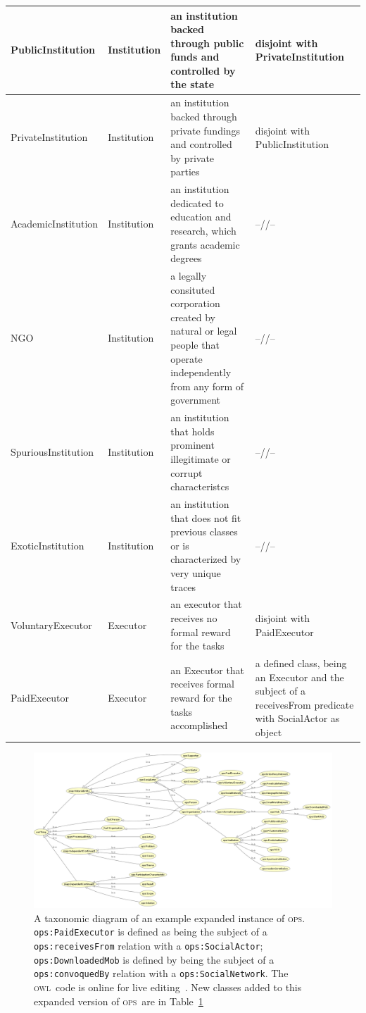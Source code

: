 \documentclass[10pt,letterpaper]{article}
\newcommand{\ops}{\textsc{ops}}
\newcommand{\owl}{\textsc{owl}}
\begin{document}
\begin{table}[!h]
\begin{adjustwidth}{-2.25in}{0in}
\begin{tabular}{|l|l|p{5.4cm}|p{5.3cm}|}
PublicInstitution & Institution & an institution backed through public funds and controlled by the state & disjoint with PrivateInstitution \\ \hline
PrivateInstitution & Institution & an institution backed through private fundings and controlled by private parties & disjoint with PublicInstitution \\ \hline
AcademicInstitution & Institution & an institution dedicated to education and research, which grants academic degrees & --//-- \\ \hline
NGO & Institution & a legally consituted corporation created by natural or legal people that operate independently from any form of government & --//-- \\\hline
SpuriousInstitution & Institution & an institution that holds prominent illegitimate or corrupt characteristcs & --//-- \\\hline
ExoticInstitution & Institution & an institution that does not fit previous classes or is characterized by very unique traces & --//-- \\\hline\hline
VoluntaryExecutor & Executor & an executor that receives no formal reward for the tasks & disjoint with PaidExecutor \\ \hline
PaidExecutor & Executor & an Executor that receives formal reward for the tasks accomplished & a defined class, being an Executor and the subject of a receivesFrom predicate with SocialActor as object\\ \hline
  \end{tabular}
  \label{ospFooClass}
\end{adjustwidth}
\end{table}

\begin{figure}[!h]
        \includegraphics[width=1.05\textwidth]{figs/opsExpandedTax}
        \caption{A taxonomic diagram of an example expanded instance of \ops.
	{\tt ops:PaidExecutor} is defined as being the subject of a
	\texttt{ops:receivesFrom} relation with a \texttt{ops:SocialActor};
	\texttt{ops:DownloadedMob} is defined by being the subject of a
	\texttt{ops:convoquedBy} relation with a \texttt{ops:SocialNetwork}.
	The \owl\ code is online for live editing~\cite{owlExp}.
	New classes added to this expanded version of \ops\ are in Table~\ref{ospFooClass}}
    \label{fig:owlExp}
    \end{figure}
\end{document}
